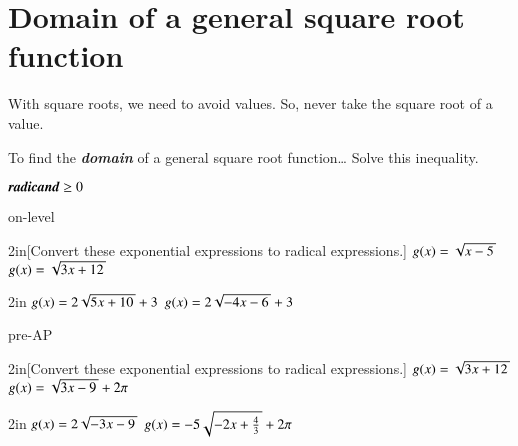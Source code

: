 \newpage
\section{Domain of a general square root function}

With square roots, we need to avoid  values. 
So, never take the square root of a  value.

\begin{myConcept}{To find the {\bfseries\itshape domain} of a general square root function\dots}
    Solve this inequality.
    \begin{myCenteredBox}[width=2in]
        \centering\LARGE 
        $ \text{\itshape\bfseries radicand} \geq 0 $ 
    \end{myCenteredBox}
\end{myConcept}




\begin{taggedblock}{on-level}
    \begin{my2Problems}{2in}[Convert these exponential expressions to radical expressions.]
        {
            $ g(x) = \myRoot{x - 5}$ 
        }
        {
            $ g(x) = \myRoot{3x + 12}$ 
        }
    \end{my2Problems}
    \begin{my2Problems}{2in}
        {
            $ g(x) = 2\myRoot{5x + 10} + 3$ 
        }
        {
            $ g(x) = 2\myRoot{-4x - 6} + 3$ 
        }
    \end{my2Problems}
\end{taggedblock}


\begin{taggedblock}{pre-AP}
    \begin{my2Problems}{2in}[Convert these exponential expressions to radical expressions.]
        {
            $ g(x) = \myRoot{3x + 12}$ 
        }
        {
            $ g(x) = \myRoot{3x - 9} + 2\pi$ 
        }
    \end{my2Problems}
    \begin{my2Problems}{2in}
        {
            $ g(x) = 2\myRoot{-3x - 9}$ 
        }
        {
            $ g(x) = -5\myRoot{-2x + \frac{4}{3}} + 2\pi$ 
        }
    \end{my2Problems}
\end{taggedblock}